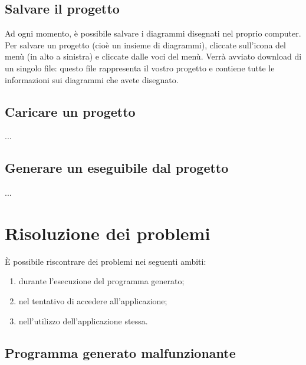 \subsection{Salvare il progetto} \label{sec:save} %

Ad ogni momento, è possibile salvare i diagrammi disegnati nel proprio computer. Per salvare un progetto (cioè un insieme di diagrammi), cliccate sull'icona del menù (in alto a sinistra) e cliccate  dalle voci del menù. Verrà avviato download di un singolo file: questo file rappresenta il vostro progetto e contiene tutte le informazioni sui diagrammi che avete disegnato.



\subsection{Caricare un progetto} \label{sec:load}

...



\subsection{Generare un eseguibile dal progetto} \label{sec:gen}

...






\section{Risoluzione dei problemi} \label{sec:problemi}

È possibile riscontrare dei problemi nei seguenti ambiti:
\begin{enumerate}
	\item durante l'esecuzione del programma generato;
	\item nel tentativo di accedere all'applicazione;
	\item nell'utilizzo dell'applicazione stessa.
\end{enumerate}



\subsection{Programma generato malfunzionante}

